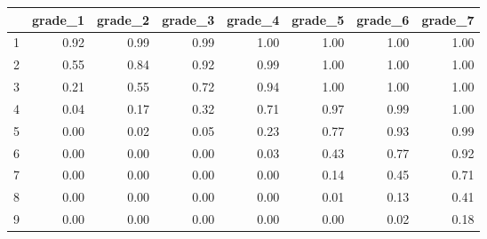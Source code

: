 \begin{table}[ht]
\centering
\begin{tabular}{rrrrrrrr}
  \hline
 &  grade\_1 & grade\_2 & grade\_3 & grade\_4 & grade\_5 & grade\_6 & grade\_7 \\ 
  \hline
1 & 0.92 & 0.99 & 0.99 & 1.00 & 1.00 & 1.00 & 1.00 \\ 
  2 &  0.55 & 0.84 & 0.92 & 0.99 & 1.00 & 1.00 & 1.00 \\ 
  3 & 0.21 & 0.55 & 0.72 & 0.94 & 1.00 & 1.00 & 1.00 \\ 
  4 & 0.04 & 0.17 & 0.32 & 0.71 & 0.97 & 0.99 & 1.00 \\ 
  5 & 0.00 & 0.02 & 0.05 & 0.23 & 0.77 & 0.93 & 0.99 \\ 
  6 & 0.00 & 0.00 & 0.00 & 0.03 & 0.43 & 0.77 & 0.92 \\ 
  7 &  0.00 & 0.00 & 0.00 & 0.00 & 0.14 & 0.45 & 0.71 \\ 
  8 & 0.00 & 0.00 & 0.00 & 0.00 & 0.01 & 0.13 & 0.41 \\ 
  9 &  0.00 & 0.00 & 0.00 & 0.00 & 0.00 & 0.02 & 0.18 \\ 
   \hline
\end{tabular}
\end{table}
